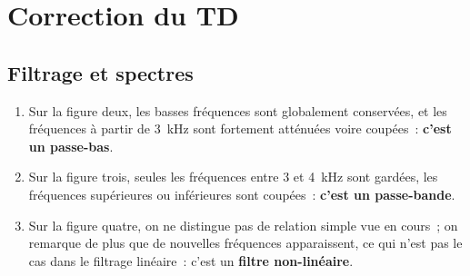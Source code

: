 \documentclass[a4paper, 12pt, final, garamond]{book}
\begin{document}
\setcounter{chapter}{6}

\chapter{Correction du TD}

\section{Filtrage et spectres}
\begin{enumerate}
    \item Sur la figure deux, les basses fréquences sont globalement conservées,
        et les fréquences à partir de \SI{3}{kHz} sont fortement atténuées voire
        coupées~: \textbf{c'est un passe-bas}.
    \item Sur la figure trois, seules les fréquences entre 3 et \SI{4}{kHz} sont
        gardées, les fréquences supérieures ou inférieures sont coupées~:
        \textbf{c'est un passe-bande}.
    \item Sur la figure quatre, on ne distingue pas de relation simple vue en
        cours~; on remarque de plus que de nouvelles fréquences apparaissent, ce
        qui n'est pas le cas dans le filtrage linéaire~: c'est un \textbf{filtre
        non-linéaire}.
\end{enumerate}
\end{document}
